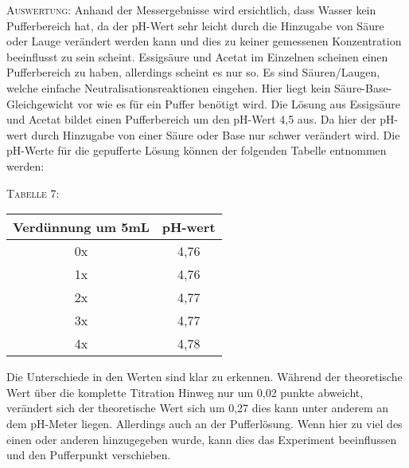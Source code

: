 \documentclass[11pt, a4paper]{article}
\begin{document}
\textsc{Auswertung:}\hspace{8mm} Anhand der Messergebnisse wird ersichtlich, dass Wasser kein Pufferbereich hat, da der pH-Wert sehr leicht durch die Hinzugabe von Säure oder Lauge verändert werden kann und dies zu keiner gemessenen Konzentration beeinflusst zu sein scheint. Essigsäure und Acetat im Einzelnen scheinen einen Pufferbereich zu haben, allerdings scheint es nur so. Es sind Säuren/Laugen, welche einfache Neutralisationsreaktionen eingehen. Hier liegt kein Säure-Base-Gleichgewicht vor wie es für ein Puffer benötigt wird. Die Lösung aus Essigsäure und Acetat bildet einen Pufferbereich um den pH-Wert 4,5 aus. Da hier der pH-wert durch Hinzugabe von einer Säure oder Base nur schwer verändert wird. Die pH-Werte für die gepufferte Lösung können der folgenden Tabelle entnommen werden:
\begin{center}
\textsc{Tabelle 7:}\\
\begin{tabular}{cc}
Verdünnung um 5mL & pH-wert\\
\hline
0x & 4,76\\
1x & 4,76\\
2x & 4,77\\
3x & 4,77\\
4x & 4,78\\
\end{tabular}
\end{center}
Die Unterschiede in den Werten sind klar zu erkennen. Während der theoretische Wert über die komplette Titration Hinweg nur um 0,02 punkte abweicht, verändert sich der theoretische Wert sich um 0,27 dies kann unter anderem an dem pH-Meter liegen. Allerdings auch an der Pufferlösung. Wenn hier zu viel des einen oder anderen hinzugegeben wurde, kann dies das Experiment beeinflussen und den Pufferpunkt verschieben.
\end{document}
